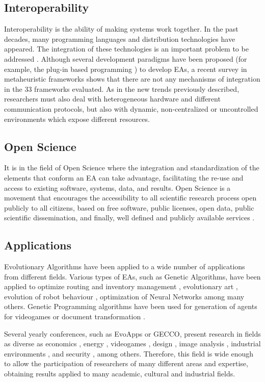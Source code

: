 \subsection{Interoperability}
Interoperability is the ability of making systems work together. In the past decades, many programming languages and distribution technologies have  appeared. The integration of these technologies is an important problem to be addressed  \cite{Papazoglou2007SOA}. Although several development paradigms have been proposed (for example, the plug-in based programming \cite{WagnerPlugins07}) to develop EAs, a recent survey in metaheuristic frameworks \cite{SURVEYMOFS} shows that there are not any mechanisms of integration in the 33 frameworks evaluated. As in the new trends previously described, researchers  must also deal  with heterogeneous hardware and different communication protocols, but also with dynamic, non-centralized or uncontrolled environments which expose different resources.

\subsection{Open Science}
It is in the field of Open Science \cite{Altunay2011OpenScience} where the integration and standardization of
the elements that conform an EA can take advantage, facilitating the re-use and access to existing software, systems, data, and results. Open Science is a movement that encourages the accessibility to all scientific research process open publicly to all citizens, based on free software, public licenses, open data, public scientific dissemination, and finally, well defined and publicly available services \cite{Foster2005Science}.


\subsection{Applications}
Evolutionary Algorithms have been applied to a wide number of applications from different fields. Various types of EAs, such as Genetic Algorithms, have been applied to optimize routing and inventory management \cite{Esparcia2009EVITA}, evolutionary art \cite{Garcia2013RGB}, evolution of robot behaviour \cite{Garcia2012testing}, optimization of Neural Networks \cite{Castillo1999gprop} among many others. Genetic Programming algorithms have been used for generation of agents for videogames \cite{Esparcia2013GPunreal} or document transformation \cite{Garcia2008XSLT}. 

Several yearly conferences, such as EvoApps or GECCO, %
present research in fields as diverse as economics \cite{Kampouridis13financial}, energy \cite{HuttererEnergy13},
videogames \cite{Mora2012Genebot}, design \cite{DorinDesign13}, image analysis \cite{AmelioImage13}, industrial environments \cite{Li13Industry}, and
security \cite{Harmer11Security}, among others. Therefore, this field is wide enough to allow
the participation of researchers of many different areas and
expertise, obtaining results applied to many academic, cultural and industrial fields. %







